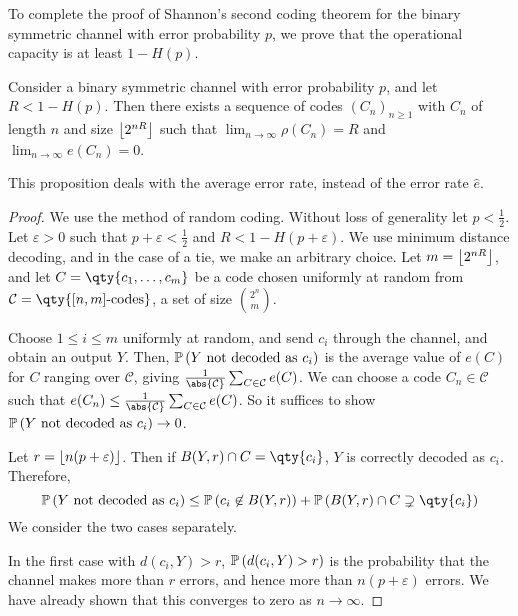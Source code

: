 To complete the proof of Shannon's second coding theorem for the binary symmetric channel with error probability $p$, we prove that the operational capacity is at least $1 - H(p)$.
\begin{proposition}
    Consider a binary symmetric channel with error probability $p$, and let $R < 1 - H(p)$.
    Then there exists a sequence of codes $(C_n)_{n \geq 1}$ with $C_n$ of length $n$ and size $\floor*{2^{nR}}$ such that $\lim_{n \to \infty} \rho(C_n) = R$ and $\lim_{n \to \infty} e(C_n) = 0$.
\end{proposition}
\begin{remark}
    This proposition deals with the average error rate, instead of the error rate $\hat e$.
\end{remark}
\begin{proof}
    We use the method of random coding.
    Without loss of generality let $p < \frac{1}{2}$.
    Let $\varepsilon > 0$ such that $p + \varepsilon < \frac{1}{2}$ and $R < 1 - H(p + \varepsilon)$.
    We use minimum distance decoding, and in the case of a tie, we make an arbitrary choice.
    Let $m = \floor*{2^{nR}}$, and let $C = \qty{c_1, \dots, c_m}$ be a code chosen uniformly at random from $\mathcal C = \qty{[n,m]\text{-codes}}$, a set of size $\binom{2^n}{m}$.

    Choose $1 \leq i \leq m$ uniformly at random, and send $c_i$ through the channel, and obtain an output $Y$.
    Then, $\prob{Y \text{ not decoded as } c_i}$ is the average value of $e(C)$ for $C$ ranging over $\mathcal C$, giving $\frac{1}{\abs{\mathcal C}} \sum_{C \in \mathcal C} e(C)$.
    We can choose a code $C_n \in \mathcal C$ such that $e(C_n) \leq \frac{1}{\abs{\mathcal C}}\sum_{C \in \mathcal C} e(C)$.
    So it suffices to show $\prob{Y \text{ not decoded as } c_i} \to 0$.

    Let $r = \floor*{n(p + \varepsilon)}$.
    Then if $B(Y,r) \cap C = \qty{c_i}$, $Y$ is correctly decoded as $c_i$.
    Therefore,
    \[ \prob{Y \text{ not decoded as } c_i} \leq \prob{c_i \not\in B(Y,r)} + \prob{B(Y,r) \cap C \supsetneq \qty{c_i}} \]
    We consider the two cases separately.

    In the first case with $d(c_i,Y) > r$, $\prob{d(c_i,Y) > r}$ is the probability that the channel makes more than $r$ errors, and hence more than $n(p + \varepsilon)$ errors.
    We have already shown that this converges to zero as $n \to \infty$.


\end{proof}
